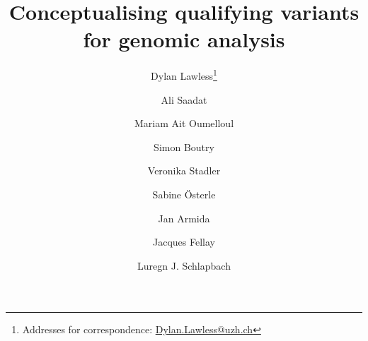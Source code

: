 
\usepackage[printonlyused,withpage,nohyperlinks]{acronym}
% 


\newcommand{\boxlabel}[1]{%
  \refstepcounter{myboxcounter}%
  \label{#1}%
}


\title{Conceptualising qualifying variants for genomic analysis}


\author[1]{Dylan Lawless\thanks{Addresses for correspondence: \href{mailto:Dylan.Lawless@uzh.ch}{Dylan.Lawless@uzh.ch}}}
\author[2]{Ali Saadat}
\author[2]{Mariam Ait Oumelloul}
\author[2]{Simon Boutry}
\author[1]{Veronika Stadler}
\author[3]{Sabine Österle}
\author[3]{Jan Armida}
\author[2]{Jacques Fellay}
\author[1]{Luregn J. Schlapbach}

\maketitle
\justify

